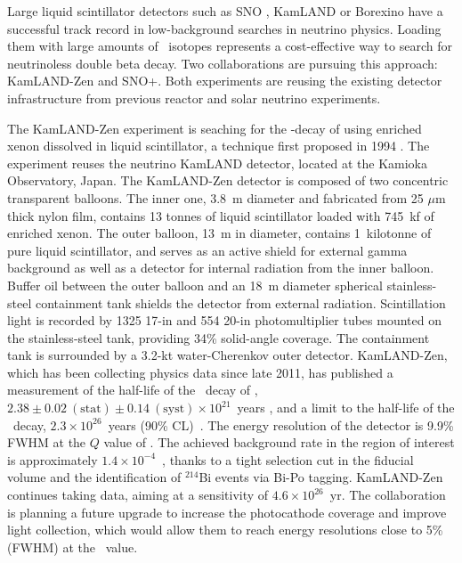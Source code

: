 %
Large liquid scintillator detectors such as SNO \cite{SNO:2002tuh}, KamLAND \cite{KamLAND:2002uet} or Borexino \cite{Borexino:2008gab} have a successful track record in low-background searches in neutrino physics. Loading them with large amounts of \bb\ isotopes represents a cost-effective way to search for neutrinoless double beta decay. Two collaborations are pursuing this approach: KamLAND-Zen and SNO+. Both experiments are reusing the existing detector infrastructure from previous reactor and solar neutrino experiments. 

The KamLAND-Zen experiment \cite{} is seaching for the \bbonu-decay of  using enriched xenon dissolved in liquid scintillator, a technique first proposed in 1994 \cite{Raghavan:1994qw}. The experiment reuses the neutrino KamLAND detector, located at the Kamioka Observatory, Japan. The KamLAND-Zen detector is composed of two concentric transparent balloons. The inner one, 3.8~m diameter and fabricated from 25 $\mu$m thick nylon film, contains 13 tonnes of liquid scintillator loaded with 745~kf of enriched xenon. The outer balloon, 13~m in diameter, contains 1~kilotonne of pure liquid scintillator, and serves as an active shield for external gamma background as well as a detector for internal radiation from the inner balloon. Buffer oil between the outer balloon and an 18~m diameter spherical stainless-steel containment tank shields the detector from external radiation. Scintillation light is recorded by 1325 17-in and 554 20-in photomultiplier tubes mounted on the stainless-steel tank, providing 34\% solid-angle coverage. The containment tank is surrounded by a 3.2-kt water-Cherenkov outer detector. KamLAND-Zen, which has been collecting physics data since late 2011, has published a measurement of the half-life of the \bbtnu\ decay of , $2.38\pm0.02~(\mathrm{stat})\pm0.14~(\mathrm{syst})\times10^{21}$~years \cite{KamLANDZen:2012aa}, and a limit to the half-life of the \bbonu\ decay, $2.3\times10^{26}$~years (90\% CL)~\cite{KamLAND-Zen:2022tow,}. The energy resolution of the detector is 9.9\% FWHM at the $Q$ value of . The achieved background rate in the region of interest is approximately $1.4\times10^{-4}$~\ckky, thanks to a tight selection cut in the fiducial volume and the identification of $^{214}$Bi events via Bi-Po tagging. KamLAND-Zen continues taking data, aiming at a sensitivity of $4.6\times10^{26}$~yr. The collaboration is planning a future upgrade to increase the photocathode coverage and improve light collection, which would allow them to reach energy resolutions close to 5\% (FWHM) at the \Qbb\ value. 

